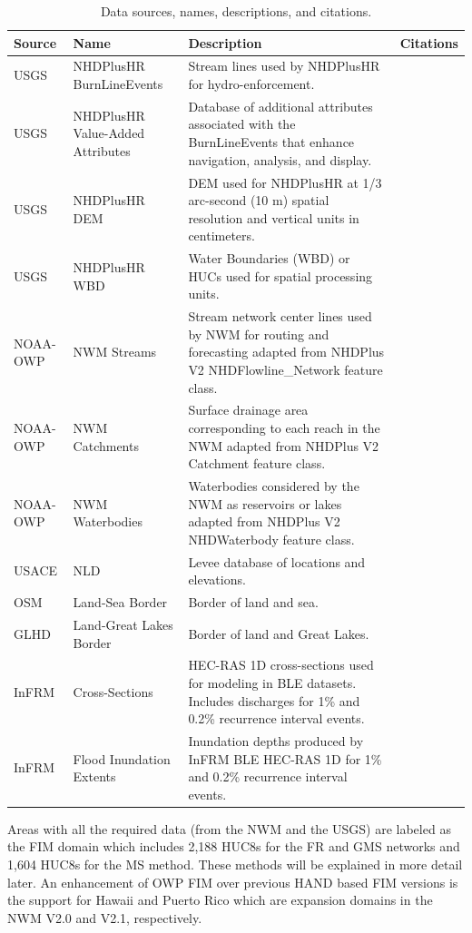 \documentclass[draft]{dependencies/agujournal2019}
\begin{document}
%
\begin{table}
\caption{Data sources, names, descriptions, and citations.}
\label{tab:data}
\centering
\begin{tabular}{|p{1.75cm}|p{4cm}|p{11cm}|p{5cm}|}
\hline
Source & Name & Description & Citations\\
\hline
USGS & NHDPlusHR BurnLineEvents & Stream lines used by NHDPlusHR for hydro-enforcement. & \cite{nhdplus2022vectors} \\
\hline
USGS & NHDPlusHR Value-Added Attributes & Database of additional attributes associated with the BurnLineEvents that enhance navigation, analysis, and display. & \cite{nhdplus2022vectors} \\
\hline
USGS & NHDPlusHR DEM & DEM used for NHDPlusHR at 1/3 arc-second (10 m) spatial resolution and vertical units in centimeters. & \cite{nhdplus2022dems} \\
\hline
USGS & NHDPlusHR WBD & Water Boundaries (WBD) or HUCs used for spatial processing units. & \cite{nhdplus2022wbd} \\
\hline
NOAA-OWP & NWM Streams & Stream network center lines used by NWM for routing and forecasting adapted from NHDPlus V2 NHDFlowline\_Network feature class. & \cite{nwm2022hydrofabric} \\
\hline
NOAA-OWP & NWM Catchments & Surface drainage area corresponding to each reach in the NWM adapted from NHDPlus V2 Catchment feature class. & \cite{nwm2022hydrofabric} \\
\hline
NOAA-OWP & NWM Waterbodies & Waterbodies considered by the NWM as reservoirs or lakes adapted from NHDPlus V2 NHDWaterbody feature class. & \cite{nwm2022hydrofabric} \\
\hline
USACE & NLD & Levee database of locations and elevations. & \cite{engineers2016national} \\
\hline
OSM & Land-Sea Border & Border of land and sea. & \cite{osm2021landsea} \\
\hline
GLHD & Land-Great Lakes Border & Border of land and Great Lakes. & \cite{GreatLakesHydrographyDataset} \\
\hline
InFRM & Cross-Sections & HEC-RAS 1D cross-sections used for modeling in BLE datasets. Includes discharges for 1\% and 0.2\% recurrence interval events. & \cite{fema2021estimated} \\
\hline
InFRM & Flood Inundation Extents & Inundation depths produced by InFRM BLE HEC-RAS 1D for 1\% and 0.2\% recurrence interval events. & \cite{fema2021estimated} \\
\hline
\end{tabular}
\end{table}
%
Areas with all the required data (from the NWM and the USGS) are labeled as the FIM domain which includes 2,188 HUC8s for the FR and GMS networks and 1,604 HUC8s for the MS method. 
These methods will be explained in more detail later.
An enhancement of OWP FIM over previous HAND based FIM versions is the support for Hawaii and Puerto Rico which are expansion domains in the NWM V2.0 and V2.1, respectively.
%
\end{document}
